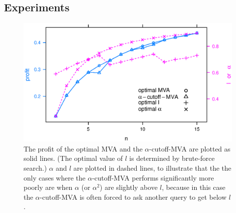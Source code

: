 
\subsection{Experiments}

\begin{figure}
\centering
    \includegraphics[trim=0mm 0mm 0mm 7mm, clip, width=\linewidth]{figures/cutoff_.2_.1_15.eps}
    \caption{The profit of the optimal MVA and the $\alpha$-cutoff-MVA are plotted as
    solid lines.  (The optimal value of $l$ is determined by brute-force
    search.)  $\alpha$ and $l$ are plotted in dashed lines, to illustrate
    that the the only cases where the $\alpha$-cutoff-MVA performs
    significantly more poorly are when $\alpha$ (or $\alpha^2$) are slightly
    above $l$, because in this case the $\alpha$-cutoff-MVA is often forced to
    ask another query to get below $l$.}\label{fig:cutoff}
\end{figure}

